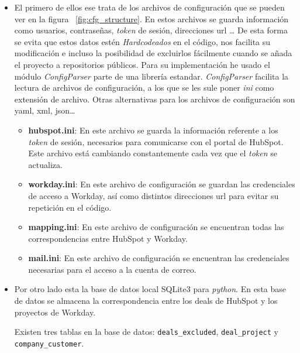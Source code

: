 \begin{itemize}[leftmargin=*]
\item El primero de ellos ese trata de los archivos de configuración que se pueden ver en la figura ~\ref{fig:cfg_structure}.
En estos archivos se guarda información como usuarios, contraseñas, \textit{token} de sesión, direcciones url \ldots
De esta forma se evita que estos datos estén \textit{Hardcodeados} en el código, nos facilita su modificación e
incluso la posibilidad de excluirlos fácilmente cuando se añada el proyecto a repositorios públicos.
Para su implementación he usado el módulo \textit{ConfigParser} \cite{ConfigParser} parte de una librería estandar. \textit{ConfigParser} facilita la lectura de archivos de configuración, a los que se les sule poner \textit{ini} como extensión de archivo.
Otras alternativas para los archivos de configuración son yaml, xml, json\ldots



\begin{itemize}
	\item [\textendash] \textbf{hubspot.ini}: En este archivo se guarda la información referente a los \textit{token} de sesión, necesarios para comunicarse con el portal de HubSpot. 
	Este archivo está cambiando constantemente cada vez que el \textit{token} se actualiza.
	\item [\textendash] \textbf{workday.ini}: En este archivo de configuración se 
	guardan las credenciales de acceso a Workday, así como distintos direcciones url para evitar su repetición en el código.
	\item [\textendash] \textbf{mapping.ini}: En este archivo de configuración se encuentran todas las correspondencias entre HubSpot y Workday.
	\item [\textendash] \textbf{mail.ini}: En este archivo de configuración se encuentran las credenciales necesarias para el acceso a la cuenta de correo.
\end{itemize}




\item Por otro lado esta la base de datos local SQLite3 \cite{sqlite3} para \textit{python}.
 En esta base de datos se almacena la correspondencia entre los deals de HubSpot y los proyectos de Workday.
 
 Existen tres tablas en la base de datos: \verb|deals_excluded|, \verb|deal_project| y \verb|company_customer|.
 

\end{itemize}
